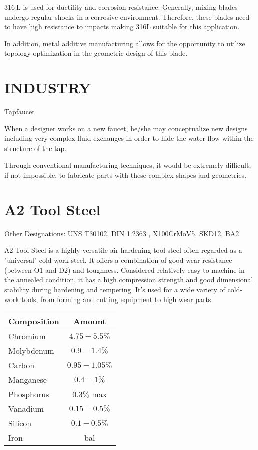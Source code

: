 \documentclass[10pt]{article}
\begin{document}
$316 \mathrm{~L}$ is used for ductility and corrosion resistance. Generally, mixing blades undergo regular shocks in a corrosive environment. Therefore, these blades need to have high resistance to impacts making 316L suitable for this application.

In addition, metal additive manufacturing allows for the opportunity to utilize topology optimization in the geometric design of this blade.

\section*{INDUSTRY}
Tapfaucet

When a designer works on a new faucet, he/she may conceptualize new designs including very complex fluid exchanges in order to hide the water flow within the structure of the tap.

Through conventional manufacturing techniques, it would be extremely difficult, if not impossible, to fabricate parts with these complex shapes and geometries.

\section*{A2 Tool Steel}
Other Designations: UNS T30102, DIN 1.2363 , X100CrMoV5, SKD12, BA2

A2 Tool Steel is a highly versatile air-hardening tool steel often regarded as a "universal" cold work steel. It offers a combination of good wear resistance (between $\mathrm{O} 1$ and D2) and toughness. Considered relatively easy to machine in the annealed condition, it has a high compression strength and good dimensional stability during hardening and tempering. It's used for a wide variety of cold-work tools, from forming and cutting equipment to high wear parts.

\begin{center}
\begin{tabular}{lc}
Composition & Amount \\
\hline
Chromium & $4.75-5.5 \%$ \\
\hline
Molybdenum & $0.9-1.4 \%$ \\
\hline
Carbon & $0.95-1.05 \%$ \\
\hline
Manganese & $0.4-1 \%$ \\
\hline
Phosphorus & $0.3 \%$ max \\
\hline
Vanadium & $0.15-0.5 \%$ \\
\hline
Silicon & $0.1-0.5 \%$ \\
\hline
Iron & bal \\
\hline
\end{tabular}
\end{center}
\end{document}

